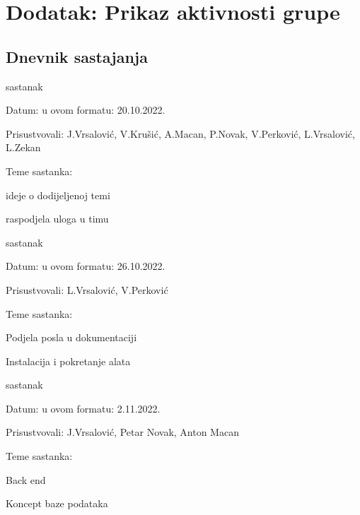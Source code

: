 \chapter*{Dodatak: Prikaz aktivnosti grupe}
		
		\section*{Dnevnik sastajanja}
		
		
		
		\begin{packed_enum}
			\item  sastanak
			
			\item[] \begin{packed_item}
				\item Datum: u ovom formatu: 20.10.2022.
				\item Prisustvovali: J.Vrsalović, V.Krušić, A.Macan, P.Novak, V.Perković, L.Vrsalović, L.Zekan
				\item Teme sastanka:
				\begin{packed_item}
					\item  ideje o dodijeljenoj temi
					\item  raspodjela uloga u timu
				\end{packed_item}
			\end{packed_item}
			
			\item  sastanak
			\item[] \begin{packed_item}
				\item Datum: u ovom formatu: 26.10.2022.
				\item Prisustvovali: L.Vrsalović, V.Perković
				\item Teme sastanka:
				\begin{packed_item}
					\item  Podjela posla u dokumentaciji
					\item  Instalacija i pokretanje alata
				\end{packed_item}
			\end{packed_item}
			
			\item  sastanak
			\item[] \begin{packed_item}
				\item Datum: u ovom formatu: 2.11.2022.
				\item Prisustvovali: J.Vrsalović, Petar Novak, Anton Macan
				\item Teme sastanka:
				\begin{packed_item}
					\item  Back end
					\item  Koncept baze podataka
				\end{packed_item}
			\end{packed_item}
			

\end{packed_enum}

